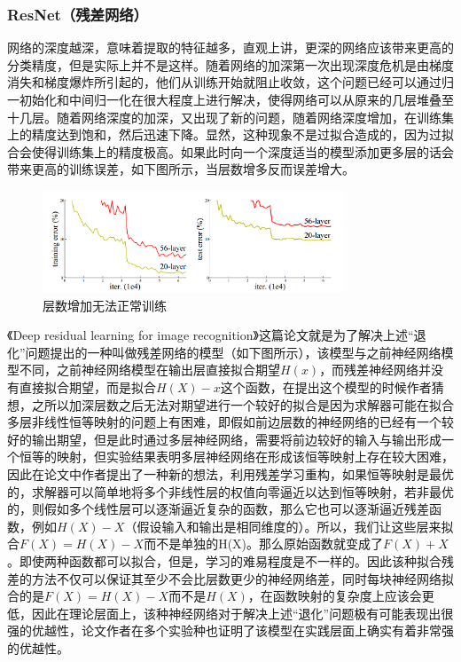 \documentclass[10pt,a4paper,twoside]{article}
\numberwithin{figure}{section}%
\numberwithin{table}{section}%
\begin{document}
\subsubsection{ResNet（残差网络）}

网络的深度越深，意味着提取的特征越多，直观上讲，更深的网络应该带来更高的分类精度，但是实际上并不是这样。随着网络的加深第一次出现深度危机是由梯度消失和梯度爆炸所引起的，他们从训练开始就阻止收敛，这个问题已经可以通过归一初始化和中间归一化在很大程度上进行解决，使得网络可以从原来的几层堆叠至十几层。随着网络深度的加深，又出现了新的问题，随着网络深度增加，在训练集上的精度达到饱和，然后迅速下降。显然，这种现象不是过拟合造成的，因为过拟合会使得训练集上的精度极高。如果此时向一个深度适当的模型添加更多层的话会带来更高的训练误差，如下图所示，当层数增多反而误差增大。

\begin{figure}[H]
    \centering
    \includegraphics[width=0.8\textwidth]{figures/图片1.png}
    \caption{层数增加无法正常训练}
    \label{fig:1}
\end{figure}

《Deep residual learning for image recognition》\cite{he2015deepresiduallearningimage}这篇论文就是为了解决上述“退化”问题提出的一种叫做残差网络的模型（如下图所示），该模型与之前神经网络模型不同，之前神经网络模型在输出层直接拟合期望$H(x)$，而残差神经网络并没有直接拟合期望，而是拟合$H(X) - x$这个函数，在提出这个模型的时候作者猜想，之所以加深层数之后无法对期望进行一个较好的拟合是因为求解器可能在拟合多层非线性恒等映射的问题上有困难，即假如前边层数的神经网络的已经有一个较好的输出期望，但是此时通过多层神经网络，需要将前边较好的输入与输出形成一个恒等的映射，但实验结果表明多层神经网络在形成该恒等映射上存在较大困难，因此在论文中作者提出了一种新的想法，利用残差学习重构，如果恒等映射是最优的，求解器可以简单地将多个非线性层的权值向零逼近以达到恒等映射，若非最优的，则假如多个线性层可以逐渐逼近复杂的函数，那么它也可以逐渐逼近残差函数，例如$H(X) - X$（假设输入和输出是相同维度的）。所以，我们让这些层来拟合$F(X) = H(X) - X$而不是单独的H(X)。那么原始函数就变成了$F(X) + X$。即使两种函数都可以拟合，但是，学习的难易程度是不一样的。因此该种拟合残差的方法不仅可以保证其至少不会比层数更少的神经网络差，同时每块神经网络拟合的是$F(X) = H(X) - X$而不是$H(X)$，在函数映射的复杂度上应该会更低，因此在理论层面上，该种神经网络对于解决上述“退化”问题极有可能表现出很强的优越性，论文作者在多个实验种也证明了该模型在实践层面上确实有着非常强的优越性。
\end{document}

